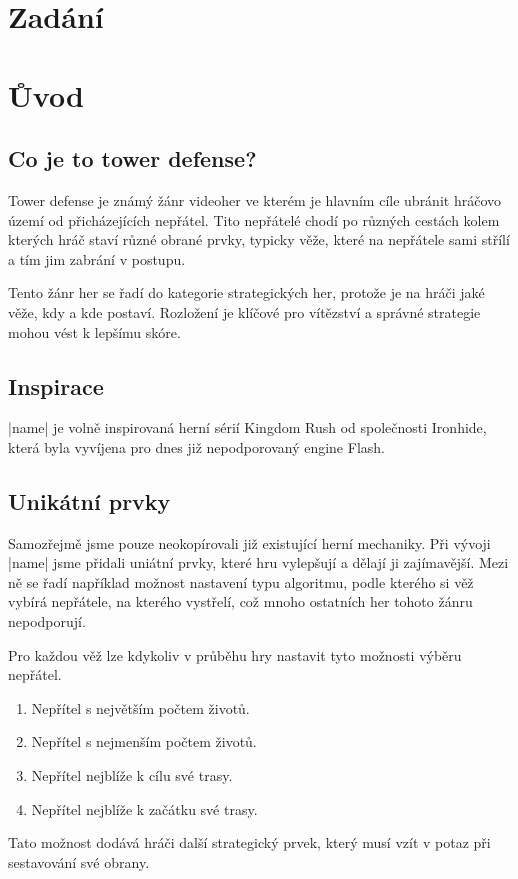 \documentclass{article}[12pt]
\begin{document}
\pagebreak

\tableofcontents

\pagebreak

\section{Zadání}
\lipsum[10]

\section{Ůvod}
\subsection{Co je to tower defense?}
Tower defense je známý žánr videoher ve kterém je hlavním cíle ubránit hráčovo území od přicházejících nepřátel. Tito nepřátelé chodí po různých cestách kolem kterých hráč staví různé obrané prvky, typicky věže, které na nepřátele sami střílí a tím jim zabrání v postupu.

Tento žánr her se řadí do kategorie strategických her, protože je na hráči jaké věže, kdy a kde postaví. Rozložení je klíčové pro vítězství a správné strategie mohou vést k lepšímu skóre.

\subsection{Inspirace}
|name| je volně inspirovaná herní sérií Kingdom Rush od společnosti Ironhide, která byla vyvíjena pro dnes již nepodporovaný engine Flash.

\subsection{Unikátní prvky}
Samozřejmě jsme pouze neokopírovali již existující herní mechaniky. Při vývoji |name| jsme přidali uniátní prvky, které hru vylepšují a dělají ji zajímavější. Mezi ně se řadí například možnost nastavení typu algoritmu, podle kterého si věž vybírá nepřátele, na kterého vystřelí, což mnoho ostatních her tohoto žánru nepodporují.

Pro každou věž lze kdykoliv v průběhu hry nastavit tyto možnosti výběru nepřátel.
\begin{enumerate}
	\item Nepřítel s největším počtem životů.
	\item Nepřítel s nejmenším počtem životů.
	\item Nepřítel nejblíže k cílu své trasy.
	\item Nepřítel nejblíže k začátku své trasy.
\end{enumerate}
Tato možnost dodává hráči další strategický prvek, který musí vzít v potaz při sestavování své obrany.
\end{document}
